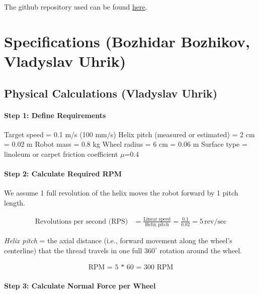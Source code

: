 \documentclass[12pt,a4paper,english]{article}
\begin{document}
The github repository used can be found \href{https://github.com/2-hardcore-4-u/RobotDesign2025}{here}. 

%

\section{Specifications (Bozhidar Bozhikov, Vladyslav Uhrik)}

\subsection{Physical Calculations (Vladyslav Uhrik)}

\paragraph{Step 1: Define Requirements}
Target speed = 0.1 m/s (100 mm/s)
Helix pitch (measured or estimated) = 2 cm = 0.02 m
Robot mass = 0.8 kg
Wheel radius = 6 cm = 0.06 m
Surface type = linoleum or carpet friction coefficient $\mu$=0.4

\paragraph{Step 2: Calculate Required RPM}

We assume 1 full revolution of the helix moves the robot forward by 1 pitch length.

\begin{align*}
    \text{Revolutions per second (RPS)} &= \frac{\text{Linear speed}}{\text{Helix pitch}} = \frac{0.1}{0.02} = 5 \, \text{rev/sec}
\end{align*}

\textit{Helix pitch} = the axial distance (i.e., forward movement along the wheel's centerline) that the thread travels in one full \( 360^\circ \) rotation around the wheel.

\begin{align*}
	\text{RPM = 5 * 60 = 300 RPM}
\end{align*}

\paragraph{Step 3: Calculate Normal Force per Wheel}
\end{document}
